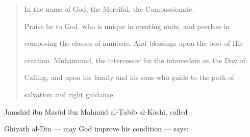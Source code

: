 \documentclass[11pt,a4paper]{article}
\begin{document}
\begin{quote}

In the name of God, the Merciful, the Compassionate.



Praise be to God, who is unique in creating units, and peerless in

composing the classes of numbers. And blessings upon the best of His

creation, Muhammad, the intercessor for the interceders on the Day of

Calling, and upon his family and his sons who guide to the path of

salvation and right guidance.

\end{quote}



\vspace{0.3cm}

\noindent Jamsh\=id ibn Mas\=ud ibn Mahm\=ud al-\d{T}ab\=ib al-K\=ash\=i, called

Ghiy\=ath al-D\=in --- may God improve his condition --- says:
\end{document}
